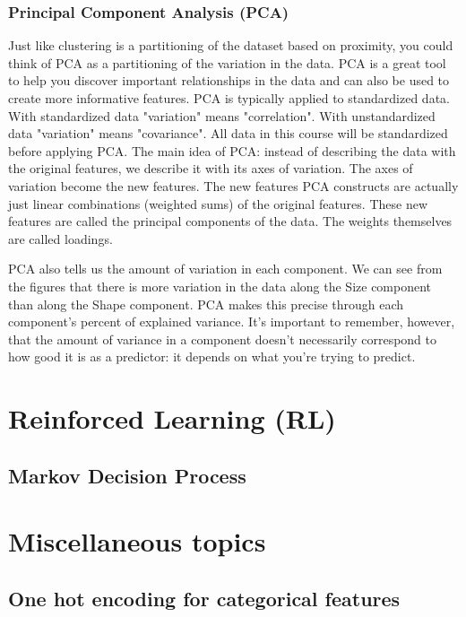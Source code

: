 \documentclass[12pt]{report}
\begin{document}
\subsection{Principal Component Analysis (PCA)}
Just like clustering is a partitioning of the dataset based on proximity, you could think of PCA as a partitioning of the variation in the data. PCA is a great tool to help you discover important relationships in the data and can also be used to create more informative features. PCA is typically applied to standardized data. With standardized data "variation" means "correlation". With unstandardized data "variation" means "covariance". All data in this course will be standardized before applying PCA. The main idea of PCA: instead of describing the data with the original features, we describe it with its axes of variation. The axes of variation become the new features. The new features PCA constructs are actually just linear combinations (weighted sums) of the original features. These new features are called the principal components of the data. The weights themselves are called loadings.

PCA also tells us the amount of variation in each component. We can see from the figures that there is more variation in the data along the Size component than along the Shape component. PCA makes this precise through each component's percent of explained variance. It's important to remember, however, that the amount of variance in a component doesn't necessarily correspond to how good it is as a predictor: it depends on what you're trying to predict.




\chapter[Reinforced Learning]{Reinforced Learning (RL)}

\section{Markov Decision Process}

\chapter[Miscellaneous topics]{Miscellaneous topics}

\section{One hot encoding for categorical features}
\label{sec:one-hot}
\end{document}

